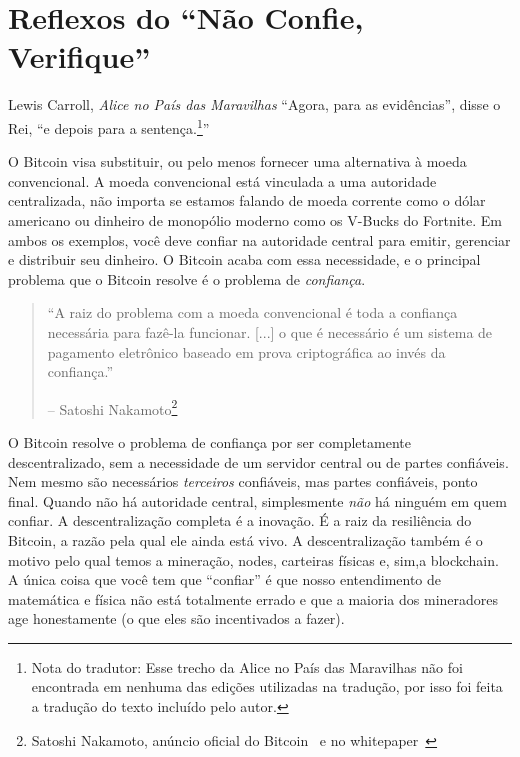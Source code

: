\chapter{Reflexos do \enquote{Não Confie, Verifique}}
\label{les:16}

\begin{chapquote}{Lewis Carroll, \textit{Alice no País das Maravilhas}}
\enquote{Agora, para as evidências}, disse o Rei, \enquote{e depois para a sentença.\footnote{Nota do tradutor: Esse trecho da Alice no País das Maravilhas não foi encontrada em nenhuma das edições utilizadas na tradução, por isso foi feita a tradução do texto incluído pelo autor.}}
\end{chapquote}

O Bitcoin visa substituir, ou pelo menos fornecer uma alternativa à moeda convencional. A moeda convencional está vinculada a uma autoridade centralizada, não importa se estamos falando de moeda corrente como o dólar americano ou dinheiro de monopólio moderno como os V-Bucks do Fortnite. Em ambos os exemplos, você deve confiar na autoridade central para emitir, gerenciar e distribuir seu dinheiro. O Bitcoin acaba com essa necessidade, e o principal problema que o Bitcoin resolve é o problema de \textit{confiança}.

\begin{quotation}\begin{samepage}
\enquote{A raiz do problema com a moeda convencional é toda a confiança necessária para fazê-la funcionar. [...] o que é necessário é um sistema de pagamento eletrônico baseado em prova criptográfica ao invés da confiança.}
\begin{flushright} -- Satoshi Nakamoto\footnote{Satoshi Nakamoto, anúncio oficial do Bitcoin~\cite{bitcoin-announcement} e no whitepaper~\cite{whitepaper}}
\end{flushright}\end{samepage}\end{quotation}

O Bitcoin resolve o problema de confiança por ser completamente descentralizado, sem a necessidade de um servidor central ou de partes confiáveis. Nem mesmo são necessários \textit{terceiros} confiáveis, mas partes confiáveis, ponto final. Quando não há autoridade central, simplesmente \textit{não} há ninguém em quem confiar. A descentralização completa é a inovação. É a raiz da resiliência do Bitcoin, a razão pela qual ele ainda está vivo. A descentralização também é o motivo pelo qual temos a mineração, nodes, carteiras físicas e, sim,a blockchain. A única coisa que você tem que \enquote{confiar} é que nosso entendimento de matemática e física não está totalmente errado e que a maioria dos mineradores age honestamente (o que eles são incentivados a fazer).

